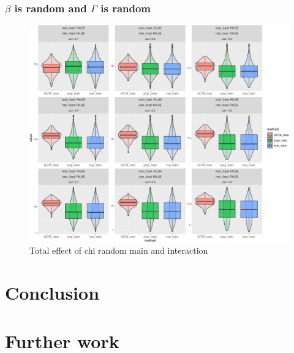 \documentclass[]{article}
\begin{document}
\clearpage

\subsubsection{\texorpdfstring{\(\beta\) is random and \(\Gamma\) is
random}{\textbackslash{}beta is random and \textbackslash{}Gamma is random}}\label{beta-is-random-and-gamma-is-random-2}

\begin{figure}
\centering
\includegraphics{Simulation_report_files/figure-latex/main_random_random_chi_combine-1.pdf}
\caption{Total effect of chi random main and interaction}
\end{figure}

\section{Conclusion}\label{conclusion}

\section{Further work}\label{further-work}
\end{document}
